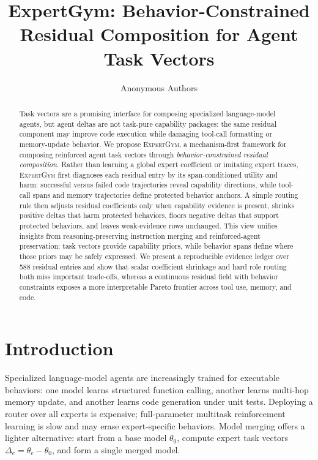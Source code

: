 \documentclass{article}
\title{ExpertGym: Behavior-Constrained Residual Composition for Agent Task Vectors}
\author{Anonymous Authors}
\newcommand{\method}{\textsc{ExpertGym}\xspace}
\begin{document}
\maketitle

\begin{abstract}
Task vectors are a promising interface for composing specialized language-model agents, but agent deltas are not task-pure capability packages: the same residual component may improve code execution while damaging tool-call formatting or memory-update behavior.  We propose \method, a mechanism-first framework for composing reinforced agent task vectors through \emph{behavior-constrained residual composition}.  Rather than learning a global expert coefficient or imitating expert traces, \method first diagnoses each residual entry by its span-conditioned utility and harm: successful versus failed code trajectories reveal capability directions, while tool-call spans and memory trajectories define protected behavior anchors.  A simple routing rule then adjusts residual coefficients only when capability evidence is present, shrinks positive deltas that harm protected behaviors, floors negative deltas that support protected behaviors, and leaves weak-evidence rows unchanged.  This view unifies insights from reasoning-preserving instruction merging and reinforced-agent preservation: task vectors provide capability priors, while behavior spans define where those priors may be safely expressed.  We present a reproducible evidence ledger over 588 residual entries and show that scalar coefficient shrinkage and hard role routing both miss important trade-offs, whereas a continuous residual field with behavior constraints exposes a more interpretable Pareto frontier across tool use, memory, and code.
\end{abstract}

\section{Introduction}

Specialized language-model agents are increasingly trained for executable behaviors: one model learns structured function calling, another learns multi-hop memory update, and another learns code generation under unit tests.  Deploying a router over all experts is expensive; full-parameter multitask reinforcement learning is slow and may erase expert-specific behaviors.  Model merging offers a lighter alternative: start from a base model $\theta_0$, compute expert task vectors $\Delta_e=\theta_e-\theta_0$, and form a single merged model.
\end{document}
